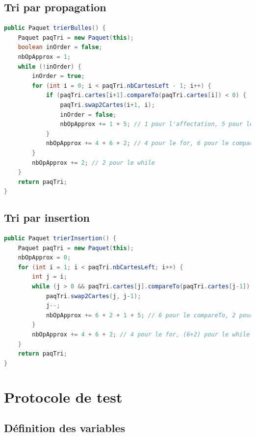\documentclass{report}
\begin{document}
\subsection{Tri par propagation}

\begin{lstlisting}[language=java, caption={\it Fonction tri à bulles}, label=codeBUL]
public Paquet trierBulles() {
    Paquet paqTri = new Paquet(this);
    boolean inOrder = false;
    nbOpApprox = 1;
    while (!inOrder) {
        inOrder = true;
        for (int i = 0; i < paqTri.nbCartesLeft - 1; i++) {
            if (paqTri.cartes[i+1].compareTo(paqTri.cartes[i]) < 0) {
                paqTri.swap2Cartes(i+1, i);
                inOrder = false;
                nbOpApprox += 1 + 5; // 1 pour l'affectation, 5 pour le swap
            }
            nbOpApprox += 4 + 6 + 2; // 4 pour le for, 6 pour le compareTo, 2 pour le if
        }
        nbOpApprox += 2; // 2 pour le while
    }
    return paqTri;
}
\end{lstlisting}

\subsection{Tri par insertion}

\begin{lstlisting}[language=java, caption={\it Fonction tri insertion}, label=codeINS]
public Paquet trierInsertion() {
    Paquet paqTri = new Paquet(this);
    nbOpApprox = 0;
    for (int i = 1; i < paqTri.nbCartesLeft; i++) {
        int j = i;
        while (j > 0 && paqTri.cartes[j].compareTo(paqTri.cartes[j-1]) < 0) {
            paqTri.swap2Cartes(j, j-1);
            j--;
            nbOpApprox += 6 + 2 + 1 + 5; // 6 pour le compareTo, 2 pour le while, 1 pour l'affectation, 5 pour le swap
        }
        nbOpApprox += 4 + 6 + 2; // 4 pour le for, (6+2) pour le while dans la cas on ne rentre pas
    }
    return paqTri;
}
\end{lstlisting}

\pagebreak



\section{Protocole de test}

\subsection{Définition des variables}
\end{document}
